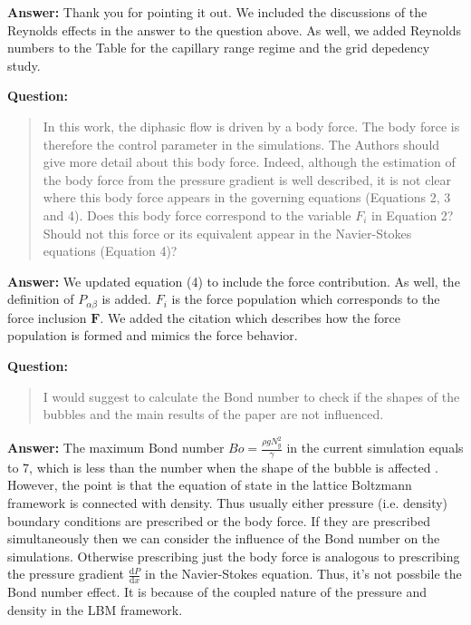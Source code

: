 \documentclass{article}
\begin{document}
\textbf{Answer:} Thank you for pointing it out. We included the discussions of the Reynolds
effects in the answer to the question above. As well, we added Reynolds numbers to the Table for
the capillary range regime and the grid depedency study. 

\textbf{Question:}
\begin{quotation}
In this work, the diphasic flow is driven by a body force. The body force is therefore the control
parameter in the simulations. The Authors should give more detail about this body force. Indeed,
although the estimation of the body force from the pressure gradient is well described, it is not
clear
where this body force appears in the governing equations (Equations 2, 3 and 4). Does this body
force correspond to the variable $F_i$ in Equation 2? Should not this force or its equivalent appear
in
the Navier-Stokes equations (Equation 4)?
\end{quotation}

\textbf{Answer:} We updated equation (4) to include the force contribution. As well, the definition
of $P_{\alpha\beta}$ is added. $F_i$ is the force population which corresponds to the force
inclusion $\bm{F}$. We added the citation which describes how the force population is formed and
mimics the force behavior.

\textbf{Question:}
\begin{quotation}
I would suggest to calculate the Bond number to check if the shapes of the bubbles and the main
results of the paper are not inﬂuenced.
\end{quotation}

\textbf{Answer:} 
The maximum Bond number $Bo=\frac{\rho g N_y^2}{\gamma}$ in the
current simulation equals to $7$, which is less than the number when the shape of the bubble is
affected \cite{zheng-large-ratio}. However, the point is that the equation of state in the lattice
Boltzmann framework is connected with density. Thus usually either pressure (i.e. density) boundary
conditions are prescribed or the body force. If they are prescribed simultaneously then
we can consider the influence of the Bond number on the simulations. Otherwise prescribing just the
body force is analogous to prescribing the pressure gradient $\frac{\mathrm{d}P}{\mathrm{d}x}$ in
the Navier-Stokes equation. Thus, it's not possbile the Bond number effect. It is because of the
coupled nature of the pressure and density in the LBM framework. 
\end{document}
